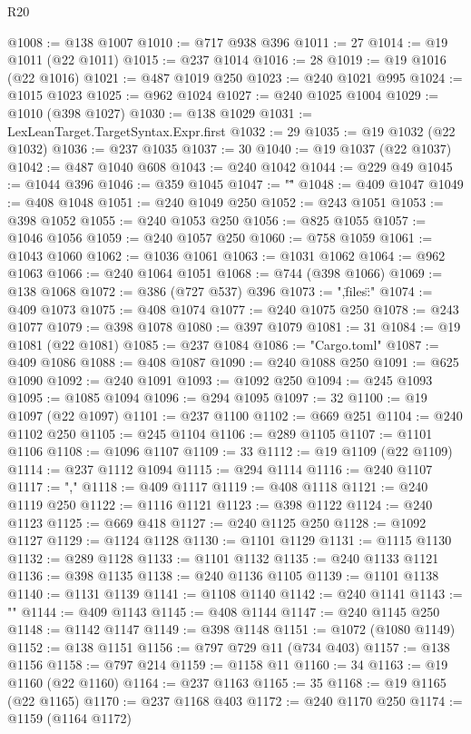 \begin{lexlean}{R20}
\begin{coremodule}
@1008 := @138 @1007
@1010 := @717 @938 @396
@1011 := 27
@1014 := @19 @1011 (@22 @1011)
@1015 := @237 @1014
@1016 := 28
@1019 := @19 @1016 (@22 @1016)
@1021 := @487 @1019 @250
@1023 := @240 @1021 @995
@1024 := @1015 @1023
@1025 := @962 @1024
@1027 := @240 @1025 @1004
@1029 := @1010 (@398 @1027)
@1030 := @138 @1029
@1031 := LexLeanTarget.TargetSyntax.Expr.first
@1032 := 29
@1035 := @19 @1032 (@22 @1032)
@1036 := @237 @1035
@1037 := 30
@1040 := @19 @1037 (@22 @1037)
@1042 := @487 @1040 @608
@1043 := @240 @1042
@1044 := @229 @49
@1045 := @1044 @396
@1046 := @359 @1045
@1047 := "\""
@1048 := @409 @1047
@1049 := @408 @1048
@1051 := @240 @1049 @250
@1052 := @243 @1051
@1053 := @398 @1052
@1055 := @240 @1053 @250
@1056 := @825 @1055
@1057 := @1046 @1056
@1059 := @240 @1057 @250
@1060 := @758 @1059
@1061 := @1043 @1060
@1062 := @1036 @1061
@1063 := @1031 @1062
@1064 := @962 @1063
@1066 := @240 @1064 @1051
@1068 := @744 (@398 @1066)
@1069 := @138 @1068
@1072 := @386 (@727 @537) @396
@1073 := ",\"files\":{"
@1074 := @409 @1073
@1075 := @408 @1074
@1077 := @240 @1075 @250
@1078 := @243 @1077
@1079 := @398 @1078
@1080 := @397 @1079
@1081 := 31
@1084 := @19 @1081 (@22 @1081)
@1085 := @237 @1084
@1086 := "Cargo.toml"
@1087 := @409 @1086
@1088 := @408 @1087
@1090 := @240 @1088 @250
@1091 := @625 @1090
@1092 := @240 @1091
@1093 := @1092 @250
@1094 := @245 @1093
@1095 := @1085 @1094
@1096 := @294 @1095
@1097 := 32
@1100 := @19 @1097 (@22 @1097)
@1101 := @237 @1100
@1102 := @669 @251
@1104 := @240 @1102 @250
@1105 := @245 @1104
@1106 := @289 @1105
@1107 := @1101 @1106
@1108 := @1096 @1107
@1109 := 33
@1112 := @19 @1109 (@22 @1109)
@1114 := @237 @1112 @1094
@1115 := @294 @1114
@1116 := @240 @1107
@1117 := ","
@1118 := @409 @1117
@1119 := @408 @1118
@1121 := @240 @1119 @250
@1122 := @1116 @1121
@1123 := @398 @1122
@1124 := @240 @1123
@1125 := @669 @418
@1127 := @240 @1125 @250
@1128 := @1092 @1127
@1129 := @1124 @1128
@1130 := @1101 @1129
@1131 := @1115 @1130
@1132 := @289 @1128
@1133 := @1101 @1132
@1135 := @240 @1133 @1121
@1136 := @398 @1135
@1138 := @240 @1136 @1105
@1139 := @1101 @1138
@1140 := @1131 @1139
@1141 := @1108 @1140
@1142 := @240 @1141
@1143 := "}"
@1144 := @409 @1143
@1145 := @408 @1144
@1147 := @240 @1145 @250
@1148 := @1142 @1147
@1149 := @398 @1148
@1151 := @1072 (@1080 @1149)
@1152 := @138 @1151
@1156 := @797 @729 @11 (@734 @403)
@1157 := @138 @1156
@1158 := @797 @214
@1159 := @1158 @11
@1160 := 34
@1163 := @19 @1160 (@22 @1160)
@1164 := @237 @1163
@1165 := 35
@1168 := @19 @1165 (@22 @1165)
@1170 := @237 @1168 @403
@1172 := @240 @1170 @250
@1174 := @1159 (@1164 @1172)

\end{coremodule}
\end{lexlean}
